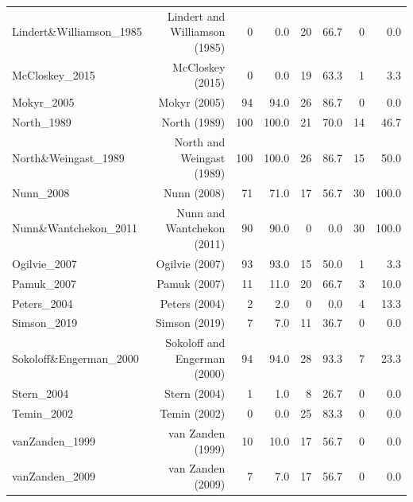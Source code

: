 \begin{table}[ht]
\begin{tabular}{lrrrrrrr}
Lindert\&Williamson\_1985 & Lindert and Williamson (1985) & 0 & 0.0 & 20 & 66.7 & 0 & 0.0 \\
McCloskey\_2015 & McCloskey (2015) & 0 & 0.0 & 19 & 63.3 & 1 & 3.3 \\
Mokyr\_2005 & Mokyr (2005) & 94 & 94.0 & 26 & 86.7 & 0 & 0.0 \\
North\_1989 & North (1989) & 100 & 100.0 & 21 & 70.0 & 14 & 46.7 \\
North\&Weingast\_1989 & North and Weingast (1989) & 100 & 100.0 & 26 & 86.7 & 15 & 50.0 \\
Nunn\_2008 & Nunn (2008) & 71 & 71.0 & 17 & 56.7 & 30 & 100.0 \\
Nunn\&Wantchekon\_2011 & Nunn and Wantchekon (2011) & 90 & 90.0 & 0 & 0.0 & 30 & 100.0 \\
Ogilvie\_2007 & Ogilvie (2007) & 93 & 93.0 & 15 & 50.0 & 1 & 3.3 \\
Pamuk\_2007 & Pamuk (2007) & 11 & 11.0 & 20 & 66.7 & 3 & 10.0 \\
Peters\_2004 & Peters (2004) & 2 & 2.0 & 0 & 0.0 & 4 & 13.3 \\
Simson\_2019 & Simson (2019) & 7 & 7.0 & 11 & 36.7 & 0 & 0.0 \\
Sokoloff\&Engerman\_2000 & Sokoloff and Engerman (2000) & 94 & 94.0 & 28 & 93.3 & 7 & 23.3 \\
Stern\_2004 & Stern (2004) & 1 & 1.0 & 8 & 26.7 & 0 & 0.0 \\
Temin\_2002 & Temin (2002) & 0 & 0.0 & 25 & 83.3 & 0 & 0.0 \\
vanZanden\_1999 & van Zanden (1999) & 10 & 10.0 & 17 & 56.7 & 0 & 0.0 \\
vanZanden\_2009 & van Zanden (2009) & 7 & 7.0 & 17 & 56.7 & 0 & 0.0 \\
\bottomrule
\end{tabular}
\end{table}
